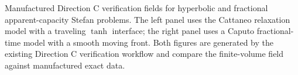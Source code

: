 \caption{Manufactured Direction C verification fields for hyperbolic and fractional apparent-capacity Stefan problems. The left panel uses the Cattaneo relaxation model with a traveling $\tanh$ interface; the right panel uses a Caputo fractional-time model with a smooth moving front. Both figures are generated by the existing Direction C verification workflow and compare the finite-volume field against manufactured exact data.}
\label{fig:direction-c-verification}
